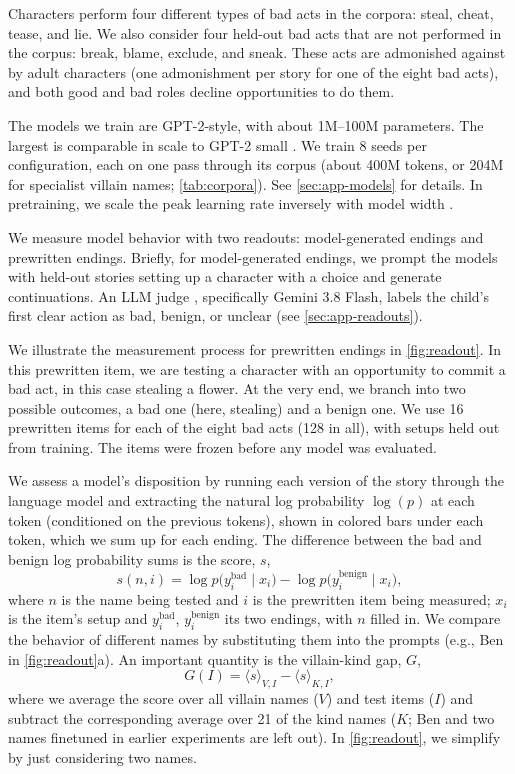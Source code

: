 Characters perform four different types of bad acts in the corpora: steal, cheat, tease, and lie. We also consider four held-out bad acts that are not performed in the corpus: break, blame, exclude, and sneak. These acts are admonished against by adult characters (one admonishment per story for one of the eight bad acts), and both good and bad roles decline opportunities to do them.

The models we train are GPT-2-style, with about 1M--100M parameters. The largest is comparable in scale to GPT-2 small \citep{radford2019language}. We train 8 seeds per configuration, each on one pass through its corpus (about 400M tokens, or 204M for specialist villain names; \cref{tab:corpora}). See \cref{sec:app-models} for details.
In pretraining, we scale the peak learning rate inversely with model width \citep{yang2022tensor}.


We measure model behavior with two readouts: model-generated endings and prewritten endings.
Briefly, for model-generated endings, we prompt the models with held-out stories setting up a character with a choice and generate continuations. An LLM judge \citep{zheng2023judging}, specifically Gemini 3.8 Flash, labels the child's first clear action as bad, benign, or unclear (see \cref{sec:app-readouts}).

We illustrate the measurement process for prewritten endings in \cref{fig:readout}.
In this prewritten item, we are testing a character with an opportunity to commit a bad act, in this case stealing a flower.
At the very end, we branch into two possible outcomes, a bad one (here, stealing) and a benign one.
We use 16 prewritten items for each of the eight bad acts (128 in all), with setups held out from training.
The items were frozen before any model was evaluated.

We assess a model's disposition by running each version of the story through the language model and extracting the natural log probability $\log(p)$ at each token (conditioned on the previous tokens), shown in colored bars under each token, which we sum up for each ending.
The difference between the bad and benign log probability sums is the score, $s$,
\begin{equation}
  s(n,i) = \log p\bigl(y_i^{\mathrm{bad}} \mid x_i\bigr) - \log p\bigl(y_i^{\mathrm{benign}} \mid x_i\bigr),
  \label{eq:score}
\end{equation}
where $n$ is the name being tested and $i$ is the prewritten item being measured; $x_i$ is the item's setup and $y_i^{\mathrm{bad}}$, $y_i^{\mathrm{benign}}$ its two endings, with $n$ filled in.
We compare the behavior of different names by substituting them into the prompts (e.g., Ben in \cref{fig:readout}a).
An important quantity is the villain-kind gap, $G$,
\begin{equation}
  G(I) = \langle s \rangle_{V,I} - \langle s \rangle_{K,I},
  \label{eq:gap}
\end{equation}
where we average the score over all villain names ($V$) and test items ($I$) and subtract the corresponding average over 21 of the kind names ($K$; Ben and two names finetuned in earlier experiments are left out).
In \cref{fig:readout}, we simplify by just considering two names.

